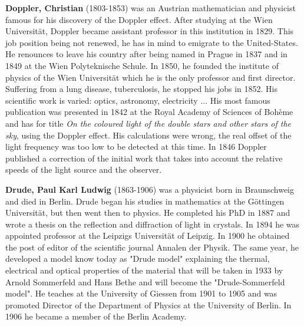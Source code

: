 \textbf{Doppler, Christian} (1803-1853) was an Austrian mathematician and physicist famous for his discovery of the Doppler effect. After studying at the Wien Universität, Doppler became assistant professor in this institution in 1829. This job position being not renewed, he has in mind to emigrate to the United-States. He renounces to leave his country after being named in Prague in 1837 and in 1849 at the Wien Polyteknische Schule. In 1850, he founded the institute of physics of the Wien Universität which he is the only professor and first director. Suffering from a lung disease, tuberculosis, he stopped his jobs in 1852. His scientific work is varied: optics, astronomy, electricity ... His most famous publication was presented in 1842 at the Royal Academy of Sciences of Bohème and has for title \textit{On the coloured light of the double stars and other stars of the sky}, using the Doppler effect. His calculations were wrong, the real offset of the light frequency was too low to be detected at this time. In 1846 Doppler published a correction of the initial work that takes into account the relative speeds of the light source and the observer.

\textbf{Drude, Paul Karl Ludwig} (1863-1906) was a physicist born in Braunschweig and died in Berlin. Drude began his studies in mathematics at the Göttingen Universität, but then went then to physics. He completed his PhD in 1887 and wrote a thesis on the reflection and diffraction of light in crystals. In 1894 he was appointed professor at the Leipzigs Universität of Leipzig. In 1900 he obtained the post of editor of the scientific journal Annalen der Physik. The same year, he developed a model know today as "Drude model" explaining the thermal, electrical and optical properties of the material that will be taken in 1933 by Arnold Sommerfeld and Hans Bethe and will become the "Drude-Sommerfeld model". He teaches at the University of Giessen from 1901 to 1905 and was promoted Director of the Department of Physics at the University of Berlin. In 1906 he became a member of the Berlin Academy.

{}
\label{sec:E}

